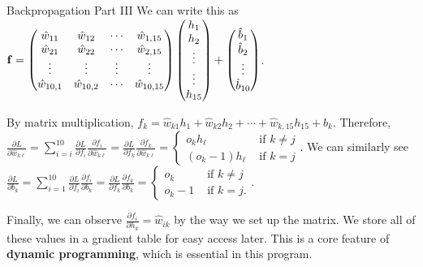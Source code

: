 \documentclass[xcolor=dvipsnames, fontsize=11pt, %
pagesize, %
parskip=half-, t]{beamer}
\begin{document}
\begin{frame}{Backpropagation Part III}
We can write this as $\bold{f}=\begin{pmatrix} \hat{w}_{11} & \hat{w}_{12} & \cdots & \hat{w}_{1,15} \\ \hat{w}_{21} & \hat{w}_{22} & \cdots & \hat{w}_{2,15} \\ \vdots & \vdots & \vdots & \vdots \\ \hat{w}_{10,1} & \hat{w}_{10,2} & \cdots & \hat{w}_{10,15} \end{pmatrix}\begin{pmatrix} h_{1} \\ h_2 \\ \vdots \\ \vdots \\ h_{15} \end{pmatrix}+\begin{pmatrix} \hat{b}_{1} \\ \hat{b}_2 \\ \vdots \\ \hat{b}_{10} \end{pmatrix}$. \vspace{0.025\textheight} \pause 

By matrix multiplication, $f_k=\hat{w}_{k1}h_1+\hat{w}_{k2}h_2+\cdots+\hat{w}_{k,15}h_{15}+b_k$. \pause Therefore, $\displaystyle \frac{\partial L}{\partial \hat{w}_{k\ell}}=\sum_{i=i}^{10} \frac{\partial L}{\partial f_i}\frac{\partial f_i}{\partial \hat{w}_{k\ell }}=\frac{\partial L}{\partial f_k}\frac{\partial f_k}{\partial \hat{w}_{k\ell}}=\begin{cases} o_kh_{\ell} & \text{ if } k\neq j \\ 
\left(o_k-1\right)h_{\ell} & \text{ if } k=j \end{cases}$. \pause We can similarly see $\displaystyle \frac{\partial L}{\partial b_k}=\sum_{i=1}^{10} \frac{\partial L}{\partial f_i}\frac{\partial f_i}{\partial b_k}=\frac{\partial L}{\partial f_k}\frac{\partial f_k}{\partial b_k}=\begin{cases} o_k & \text{ if } k\neq j \\ o_k-1&  \text{ if } k=j. \end{cases}$. \pause \vspace{0.025\textheight}

Finally, we can observe $\frac{\partial f_i}{\partial h_k}=\hat{w}_{ik}$ by the way we set up the matrix. We store all of these values in a gradient table for easy access later. This is a core feature of \textbf{dynamic programming}, which is essential in this program.
\end{frame}
\end{document}
